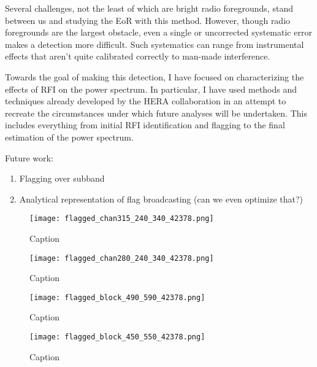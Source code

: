 \documentclass[12pt]{article}
\begin{document}
Several challenges, not the least of which are bright radio foregrounds, stand between us and studying the EoR with this method. However, though radio foregrounds are the largest obstacle, even a single  or uncorrected systematic error makes a detection more difficult. Such systematics can range from instrumental effects that aren't quite calibrated correctly to man-made interference.

Towards the goal of making this detection, I have focused on characterizing the effects of RFI on the power spectrum. In particular, I have used methods and techniques already developed by the HERA collaboration in an attempt to recreate the circumstances under which future analyses will be undertaken. This includes everything from initial RFI identification and flagging to the final estimation of the power spectrum.

Future work:
\begin{enumerate}
	\item Flagging over subband
	\item Analytical representation of flag broadcasting (can we even optimize that?)
\end{enumerate}




\begin{figure}[p]
	\centering
	\texttt{[image: flagged\_chan315\_240\_340\_42378.png]}
	\caption[Power spectrum after flagging one extra edge channel]{Caption}
	\label{fig:flaggedchan315}
\end{figure}

\begin{figure}[p]
	\centering
	\texttt{[image: flagged\_chan280\_240\_340\_42378.png]}
	\caption[Power spectrum after flagging one central channel]{Caption}
	\label{fig:flagged_chan280}
\end{figure}

\begin{figure}[p]
	\centering
	\texttt{[image: flagged\_block\_490\_590\_42378.png]}
	\caption[Power spectrum after flagging extra contiguous edge channels]{Caption}
	\label{fig:flagged_chan_315}
\end{figure}

\begin{figure}[p]
	\centering
	\texttt{[image: flagged\_block\_450\_550\_42378.png]}
	\caption[Power spectrum after flagging contiguous extra center channels]{Caption}
	\label{fig:flagged_block_450_550}
\end{figure}
\end{document}
